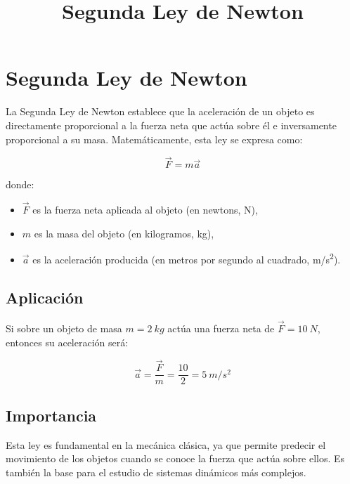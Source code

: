 \documentclass[12pt]{article}
\title{Segunda Ley de Newton}
\author{}
\date{}
\begin{document}
\maketitle

\section{Segunda Ley de Newton}

La Segunda Ley de Newton establece que la aceleración de un objeto es directamente proporcional a la fuerza neta que actúa sobre él e inversamente proporcional a su masa. Matemáticamente, esta ley se expresa como:

\begin{equation}
    \vec{F} = m \vec{a}
\end{equation}

donde:
\begin{itemize}
    \item $\vec{F}$ es la fuerza neta aplicada al objeto (en newtons, N),
    \item $m$ es la masa del objeto (en kilogramos, kg),
    \item $\vec{a}$ es la aceleración producida (en metros por segundo al cuadrado, m/s\textsuperscript{2}).
\end{itemize}

\subsection{Aplicación}

Si sobre un objeto de masa $m = \SI{2}{kg}$ actúa una fuerza neta de $\vec{F} = \SI{10}{N}$, entonces su aceleración será:

\begin{equation}
    \vec{a} = \frac{\vec{F}}{m} = \frac{10}{2} = \SI{5}{m/s^2}
\end{equation}

\subsection{Importancia}

Esta ley es fundamental en la mecánica clásica, ya que permite predecir el movimiento de los objetos cuando se conoce la fuerza que actúa sobre ellos. Es también la base para el estudio de sistemas dinámicos más complejos.
\end{document}

